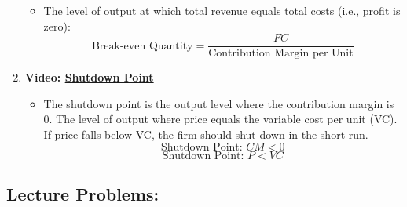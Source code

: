 \documentclass[
]{book}
\providecommand{\tightlist}{%
  \setlength{\itemsep}{0pt}\setlength{\parskip}{0pt}}
\begin{document}
\begin{enumerate}
  \begin{itemize}
  \tightlist
  \item
    The level of output at which total revenue equals total costs (i.e., profit is zero):
    \[
     \text{Break-even Quantity} = \frac{FC}{\text{Contribution Margin per Unit}}
     \]
  \end{itemize}
\item
  \textbf{Video: \href{https://youtu.be/td4Veo3q4r4}{Shutdown Point}}

  \begin{itemize}
  \tightlist
  \item
    The shutdown point is the output level where the contribution margin is 0. The level of output where price equals the variable cost per unit (VC). If price falls below VC, the firm should shut down in the short run.
    \[
     \text{Shutdown Point: } CM < 0
     \]
    \[
     \text{Shutdown Point: } P < VC
     \]
  \end{itemize}
\end{enumerate}

\subsection*{Lecture Problems:}\label{lecture-problems-4}
\end{document}
